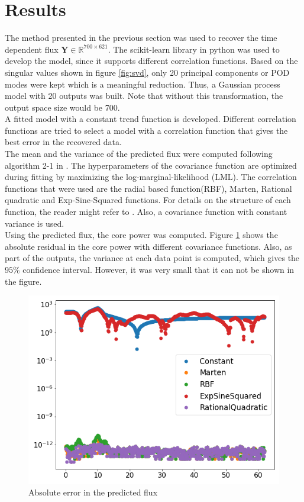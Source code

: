 \documentclass{anstrans}
\begin{document}
\section{Results}
The method presented in the previous section was used to recover the time dependent flux $\textbf{Y} \in \mathbb{R}^{700\times 621}$. The scikit-learn library in python\cite{scikit-learn} was used to develop the model, since it supports different correlation functions.
Based on the singular values shown in figure \ref{fig:svd}, only 20 principal components or POD modes were kept which is a meaningful reduction. Thus, a Gaussian process model with 20 outputs was built. Note that without this transformation, the output space size would be 700.\\
A fitted model with a constant trend function is developed. Different correlation functions are tried to   select a model with a correlation function that gives the best error in the recovered data. \\
The mean and the variance of the predicted flux were computed following algorithm 2-1 in \cite{rasmussen2003gaussian}. The hyperparameters of the covariance function are optimized during fitting by maximizing the log-marginal-likelihood (LML).
The correlation functions that were used are the radial based function(RBF), Marten, Rational quadratic and Exp-Sine-Squared functions.
For details on the structure of each function, the reader might refer to \cite{rasmussen2003gaussian}. Also, a covariance function with constant variance is used.\\
Using the predicted flux, the core power was computed. Figure \ref{gp_kernels} shows the absolute residual in the core power with different covariance functions.
Also, as part of the outputs, the variance at each data point is computed, which gives the $95\%$ confidence interval. However, it was very small that it can not be shown in the figure.
\begin{figure}[ht!]
	\includegraphics[scale=0.4]{./figs/gp_kernels.png}
	\caption{Absolute error in the predicted flux}
	\label{gp_kernels}
\end{figure}
\end{document}
